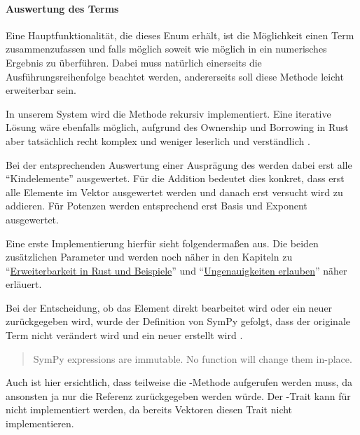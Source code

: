 \documentclass[11pt,a4paper, ngerman]{article}
\begin{document}
\paragraph{Auswertung des Terms} Eine Hauptfunktionalität, die dieses Enum erhält, ist die Möglichkeit einen Term zusammenzufassen und falls möglich soweit wie möglich in ein numerisches Ergebnis zu überführen. Dabei muss natürlich einerseits die Ausführungsreihenfolge beachtet werden, andererseits soll diese Methode leicht erweiterbar sein.

In unserem System wird die Methode rekursiv implementiert. Eine iterative Lösung wäre ebenfalls möglich, aufgrund des Ownership und Borrowing in Rust aber tatsächlich recht komplex und weniger leserlich und verständlich \cite{RustRecToItAst}.

Bei der entsprechenden Auswertung einer Ausprägung des  werden dabei erst alle ``Kindelemente'' ausgewertet. Für die Addition bedeutet dies konkret, dass erst alle Elemente im Vektor ausgewertet werden und danach erst versucht wird zu addieren. Für Potenzen werden entsprechend erst Basis und Exponent ausgewertet.

Eine erste Implementierung hierfür sieht folgendermaßen aus. Die beiden zusätzlichen Parameter  und  werden noch näher in den Kapiteln zu ``\hyperref[sec:kapErRustUndBei]{Erweiterbarkeit in Rust und Beispiele}'' und ``\hyperref[sec:ungenauigkeitenKapitel]{Ungenauigkeiten erlauben}'' näher erläuert.

Bei der Entscheidung, ob das Element direkt bearbeitet wird oder ein neuer  zurückgegeben wird, wurde der Definition von SymPy gefolgt, dass der originale Term nicht verändert wird und ein neuer erstellt wird \cite{SymPySubs}.

\begin{quote}
    SymPy expressions are immutable. No function will change them in-place.
\end{quote}

Auch ist hier ersichtlich, dass teilweise die -Methode aufgerufen werden muss, da ansonsten ja nur die Referenz  zurückgegeben werden würde. Der -Trait kann für  nicht implementiert werden, da bereits Vektoren diesen Trait nicht implementieren.
\end{document}
